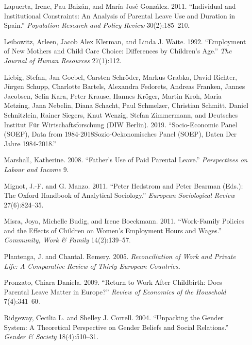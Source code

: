 \documentclass[
  12pt,
]{article}
\begin{document}
\leavevmode\hypertarget{ref-lapuerta_individual_2011}{}%
Lapuerta, Irene, Pau Baizán, and María José González. 2011. ``Individual and Institutional Constraints: An Analysis of Parental Leave Use and Duration in Spain.'' \emph{Population Research and Policy Review} 30(2):185--210.

\leavevmode\hypertarget{ref-leibowitz_employment_1992}{}%
Leibowitz, Arleen, Jacob Alex Klerman, and Linda J. Waite. 1992. ``Employment of New Mothers and Child Care Choice: Differences by Children's Age.'' \emph{The Journal of Human Resources} 27(1):112.

\leavevmode\hypertarget{ref-liebig_socio-economic_2019}{}%
Liebig, Stefan, Jan Goebel, Carsten Schröder, Markus Grabka, David Richter, Jürgen Schupp, Charlotte Bartels, Alexandra Fedorets, Andreas Franken, Jannes Jacobsen, Selin Kara, Peter Krause, Hannes Kröger, Martin Kroh, Maria Metzing, Jana Nebelin, Diana Schacht, Paul Schmelzer, Christian Schmitt, Daniel Schnitzlein, Rainer Siegers, Knut Wenzig, Stefan Zimmermann, and Deutsches Institut Für Wirtschaftsforschung (DIW Berlin). 2019. ``Socio-Economic Panel (SOEP), Data from 1984-2018Sozio-Oekonomisches Panel (SOEP), Daten Der Jahre 1984-2018.''

\leavevmode\hypertarget{ref-marshall_fathers_2008}{}%
Marshall, Katherine. 2008. ``Father's Use of Paid Parental Leave.'' \emph{Perspectives on Labour and Income} 9.

\leavevmode\hypertarget{ref-mignot_peter_2011}{}%
Mignot, J.-F. and G. Manzo. 2011. ``Peter Hedstrom and Peter Bearman (Eds.): The Oxford Handbook of Analytical Sociology.'' \emph{European Sociological Review} 27(6):824--35.

\leavevmode\hypertarget{ref-misra_work-family_2011}{}%
Misra, Joya, Michelle Budig, and Irene Boeckmann. 2011. ``Work-Family Policies and the Effects of Children on Women's Employment Hours and Wages.'' \emph{Community, Work \& Family} 14(2):139--57.

\leavevmode\hypertarget{ref-plantenga_reconciliation_2005}{}%
Plantenga, J. and Chantal. Remery. 2005. \emph{Reconciliation of Work and Private Life: A Comparative Review of Thirty European Countries.}

\leavevmode\hypertarget{ref-pronzato_return_2009}{}%
Pronzato, Chiara Daniela. 2009. ``Return to Work After Childbirth: Does Parental Leave Matter in Europe?'' \emph{Review of Economics of the Household} 7(4):341--60.

\leavevmode\hypertarget{ref-ridgeway_unpacking_2004}{}%
Ridgeway, Cecilia L. and Shelley J. Correll. 2004. ``Unpacking the Gender System: A Theoretical Perspective on Gender Beliefs and Social Relations.'' \emph{Gender \& Society} 18(4):510--31.
\end{document}
